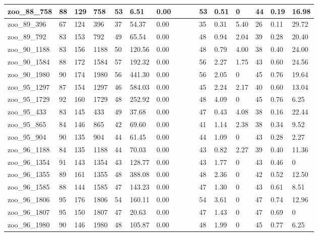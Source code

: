 \begin{landscape}
\begin{longtable}{llllllllllllllll}
zoo\_88\_758 & 88 & 129 & 758 & 53 & 6.51 & 0.00 &  &  &  & 53 & 0.51 & 0 & 44 & 0.19 & 16.98 \\ \hline 
zoo\_89\_396 & 67 & 124 & 396 & 37 & 54.37 & 0.00 &  &  &  & 35 & 0.31 & 5.40 & 26 & 0.11 & 29.72 \\ \hline 
zoo\_89\_792 & 83 & 153 & 792 & 49 & 65.54 & 0.00 &  &  &  & 48 & 0.94 & 2.04 & 39 & 0.28 & 20.40 \\ \hline 
zoo\_90\_1188 & 83 & 156 & 1188 & 50 & 120.56 & 0.00 &  &  &  & 48 & 0.79 & 4.00 & 38 & 0.40 & 24.00 \\ \hline 
zoo\_90\_1584 & 88 & 172 & 1584 & 57 & 192.32 & 0.00 &  &  &  & 56 & 2.27 & 1.75 & 43 & 0.60 & 24.56 \\ \hline 
zoo\_90\_1980 & 90 & 174 & 1980 & 56 & 441.30 & 0.00 &  &  &  & 56 & 2.05 & 0 & 45 & 0.76 & 19.64 \\ \hline 
zoo\_95\_1297 & 87 & 154 & 1297 & 46 & 584.03 & 0.00 &  &  &  & 45 & 2.24 & 2.17 & 40 & 0.60 & 13.04 \\ \hline 
zoo\_95\_1729 & 92 & 160 & 1729 & 48 & 252.92 & 0.00 &  &  &  & 48 & 4.09 & 0 & 45 & 0.76 & 6.25 \\ \hline 
zoo\_95\_433 & 83 & 145 & 433 & 49 & 37.68 & 0.00 &  &  &  & 47 & 0.43 & 4.08 & 38 & 0.16 & 22.44 \\ \hline 
zoo\_95\_865 & 84 & 146 & 865 & 42 & 69.60 & 0.00 &  &  &  & 41 & 1.14 & 2.38 & 38 & 0.34 & 9.52 \\ \hline 
zoo\_95\_904 & 90 & 135 & 904 & 44 & 61.45 & 0.00 &  &  &  & 44 & 1.09 & 0 & 43 & 0.28 & 2.27 \\ \hline 
zoo\_96\_1188 & 84 & 135 & 1188 & 44 & 70.03 & 0.00 &  &  &  & 43 & 0.82 & 2.27 & 39 & 0.40 & 11.36 \\ \hline 
zoo\_96\_1354 & 91 & 143 & 1354 & 43 & 128.77 & 0.00 &  &  &  & 43 & 1.77 & 0 & 43 & 0.46 & 0 \\ \hline 
zoo\_96\_1355 & 89 & 161 & 1355 & 48 & 388.08 & 0.00 &  &  &  & 48 & 2.36 & 0 & 42 & 0.52 & 12.50 \\ \hline 
zoo\_96\_1585 & 88 & 144 & 1585 & 47 & 143.23 & 0.00 &  &  &  & 47 & 1.30 & 0 & 43 & 0.61 & 8.51 \\ \hline 
zoo\_96\_1806 & 95 & 176 & 1806 & 54 & 160.11 & 0.00 &  &  &  & 54 & 3.61 & 0 & 47 & 0.74 & 12.96 \\ \hline 
zoo\_96\_1807 & 95 & 150 & 1807 & 47 & 20.63 & 0.00 &  &  &  & 47 & 1.43 & 0 & 47 & 0.69 & 0 \\ \hline 
zoo\_96\_1980 & 90 & 146 & 1980 & 48 & 105.87 & 0.00 &  &  &  & 48 & 1.99 & 0 & 45 & 0.77 & 6.25 \\ \hline 

\end{longtable}
\end{landscape}
